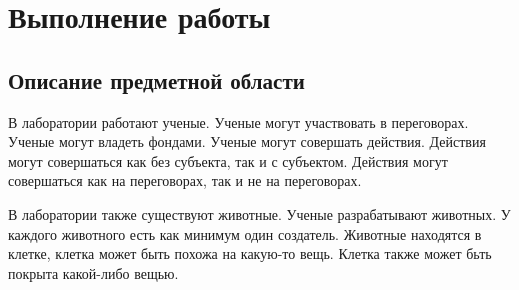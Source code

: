 \section{Выполнение работы}
\subsection{Описание предметной области}
В лаборатории работают ученые.
Ученые могут участвовать в переговорах.
Ученые могут владеть фондами.
Ученые могут совершать действия.
Действия могут совершаться как без субъекта, так и с субъектом.
Действия могут совершаться как на переговорах, так и не на переговорах.

В лаборатории также существуют животные.
Ученые разрабатывают животных.
У каждого животного есть как минимум один создатель.
Животные находятся в клетке, клетка может быть похожа на какую-то вещь.
Клетка также может бьть покрыта какой-либо вещью.


